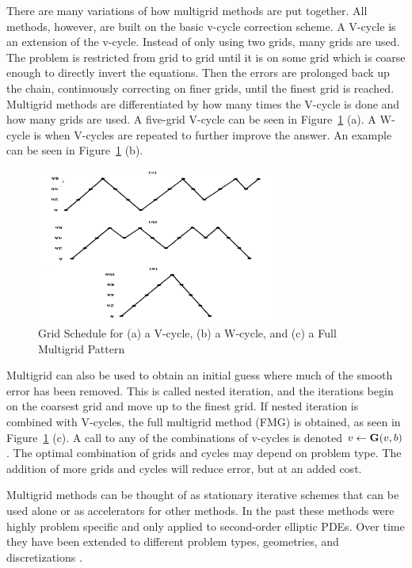 There are many variations of how multigrid methods are put together. All methods, however, are built on the basic v-cycle correction scheme. A V-cycle is an extension of the v-cycle. Instead of only using two grids, many grids are used. The problem is restricted from grid to grid until it is on some grid which is coarse enough to directly invert the equations. Then the errors are prolonged back up the chain, continuously correcting on finer grids, until the finest grid is reached. Multigrid methods are differentiated by how many times the V-cycle is done and how many grids are used. A five-grid V-cycle can be seen in Figure~\ref{fig:Vcycle} (a). A W-cycle is when V-cycles are repeated to further improve the answer. An example can be seen in Figure~\ref{fig:Vcycle} (b). 
\begin{figure}
    \begin{center}
      \includegraphics [width=0.7\textwidth, height=0.7\textheight, angle=180 ] {multigridFig}
   \end{center}
   \caption{Grid Schedule for (a) a V-cycle, (b) a W-cycle, and (c) a Full Multigrid Pattern \cite{Briggs2000}}
   \label{fig:Vcycle}
\end{figure}

Multigrid can also be used to obtain an initial guess where much of the smooth error has been removed. This is called nested iteration, and the iterations begin on the coarsest grid and move up to the finest grid. If nested iteration is combined with V-cycles, the full multigrid method (FMG) is obtained, as seen in Figure~\ref{fig:Vcycle} (c). A call to any of the combinations of v-cycles is denoted $v \leftarrow \mathbf{G}(v, b)$. The optimal combination of grids and cycles may depend on problem type. The addition of more grids and cycles will reduce error, but at an added cost. 

Multigrid methods can be thought of as stationary iterative schemes that can be used alone or as accelerators for other methods. In the past these methods were highly problem specific and only applied to second-order elliptic PDEs. Over time they have been extended to different problem types, geometries, and discretizations \cite{Benzi2002}. 

